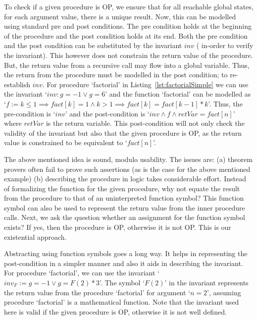 \documentclass{llncs}
\newcommand{\inv}{\mathit{inv}}
\newcommand{\retVar}{\textit{retVar}}
\newcommand{\F}{\mathit{F}}
\newcommand{\fact}{\mathit{fact}}
\begin{document}
To check if a given procedure is OP, we ensure that for all reachable
global states, for each argument value, there is a unique result. Now,
this can be modelled using standard pre and post conditions. The pre
condition holds at the beginning of the procedure and the post
condition holds at its end. Both the pre condition and the post
condition can be substituted by the invariant $\inv$ ( in-order to
verify the invariant). This however does not constrain the return value of the
procedure. But, the return value from a recursive call may flow
into a global variable. Thus, the return from the procedure must be
modelled in the post condition; to re-establish $\inv$.  For procedure
`factorial' in Listing~\ref{lst:factorialSimple} we can use the
invariant `$\inv : g = -1 \vee g = 6$' and the function `factorial'
can be modelled as `$ f := k \leq 1 \implies \fact[k] = 1 \wedge k >1
\implies \fact[k] = \fact[k-1]*k$'. Thus, the pre-condition is
`$\inv$' and the post-condition is `$\inv \wedge f \wedge \retVar =
fact[n]$' where $\retVar$ is the return variable. This post-condition
will not only check the validity of the invariant but also that the
given procedure is OP, as the return value is constrained to be
equivalent to `$fact[n]$'.

The above mentioned idea is sound, modulo usability. The issues are:
(a) theorem provers often fail to prove such assertions (as is the
case for the above mentioned example) (b) describing the procedure in
logic takes considerable effort.  Instead of formalizing the function
for the given procedure, why not equate the result from the procedure
to that of an uninterpreted function symbol? This function symbol can
also be used to represent the return value from the inner procedure
calls. Next, we ask the question whether an assignment for the
function symbol exists? If yes, then the procedure is OP, otherwise it
is not OP.  This is our existential approach.

Abstracting using function symbols goes a long way. It helps in
representing the post-condition in a simpler manner and also it aids
in describing the invariant. For procedure `factorial', we can use
the invariant `$\inv_{\F}:=g = -1 \vee g = \F(2) * 3$'. The symbol
`$\F(2)$' in the invariant represents the return value from the
procedure `factorial' for argument `$n = 2$', assuming procedure
`factorial' is a mathematical function. Note that the invariant used
here is valid if the given procedure is OP, otherwise it is not well
defined.

\end{document}
